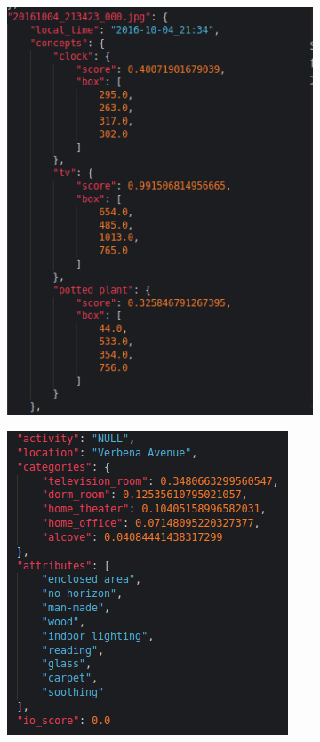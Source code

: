 \begin{figure}[H]
\begin{subfigure}{0.365\textwidth}
      \includegraphics[width=\textwidth]{Sections/4InitialWork/4_images_random/process1.png} 
      \end{subfigure}
      \begin{subfigure}{0.45\textwidth}
      \includegraphics[width=\textwidth]{Sections/4InitialWork/4_images_random/process2.png}

\end{subfigure}
\end{figure}
